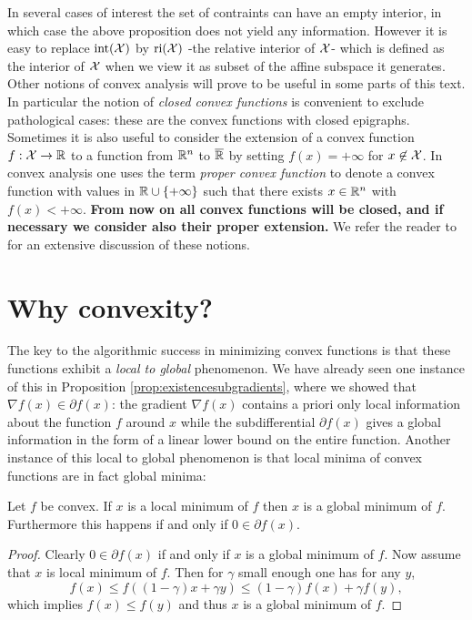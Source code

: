 In several cases of interest the set of contraints can have an empty interior, in which case the above proposition does not yield any information. However it is easy to replace $\mathrm{int}(\mathcal{X})$ by $\mathrm{ri}(\mathcal{X})$ -the relative interior of $\mathcal{X}$- which is defined as the interior of $\mathcal{X}$ when we view it as subset of the affine subspace it generates. Other notions of convex analysis will prove to be useful in some parts of this text. In particular the notion of {\em closed convex functions} is convenient to exclude pathological cases: these are the convex functions with closed epigraphs. Sometimes it is also useful to consider the extension of a convex function $f: \mathcal{X} \rightarrow \mathbb{R}$ to a function from $\mathbb{R}^n$ to $\overline{\mathbb{R}}$ by setting $f(x)= + \infty$ for $x \not\in \mathcal{X}$. In convex analysis one uses the term {\em proper convex function} to denote a convex function with values in $\mathbb{R} \cup \{+\infty\}$ such that there exists $x \in \mathbb{R}^n$ with $f(x) < +\infty$. \textbf{From now on all convex functions will be closed, and if necessary we consider also their proper extension.} We refer the reader to \cite{Roc70} for an extensive discussion of these notions.

\section{Why convexity?}
The key to the algorithmic success in minimizing convex functions is that these functions exhibit a {\em local to global} phenomenon. We have already seen one instance of this in Proposition \ref{prop:existencesubgradients}, where we showed that $\nabla f(x) \in \partial f(x)$: the gradient $\nabla f(x)$ contains a priori only local information about the function $f$ around $x$ while the subdifferential $\partial f(x)$ gives a global information in the form of a linear lower bound on the entire function. Another instance of this local to global phenomenon is that local minima of convex functions are in fact global minima:

\begin{proposition}
Let $f$ be convex. If $x$ is a local minimum of $f$ then $x$ is a global minimum of $f$. Furthermore this happens if and only if $0 \in \partial f(x)$.
\end{proposition}

\begin{proof}
Clearly $0 \in \partial f(x)$ if and only if $x$ is a global minimum of $f$. Now assume that $x$ is local minimum of $f$. Then for $\gamma$ small enough one has for any $y$,
$$f(x) \leq f((1-\gamma) x + \gamma y) \leq (1-\gamma) f(x) + \gamma f(y) ,$$
which implies $f(x) \leq f(y)$ and thus $x$ is a global minimum of $f$.
\end{proof}

